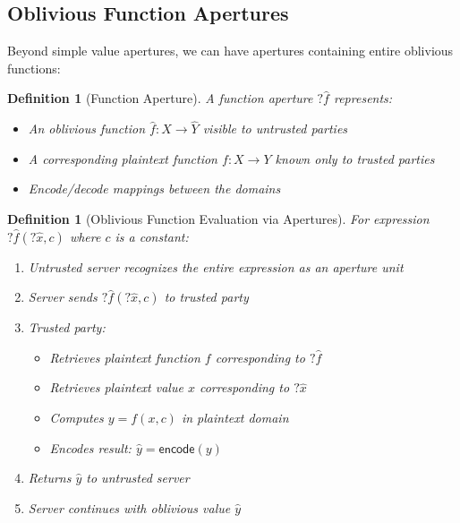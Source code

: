 \documentclass[12pt]{article}
\newtheorem{definition}[theorem]{Definition}
\begin{document}
\subsection{Oblivious Function Apertures}

Beyond simple value apertures, we can have apertures containing entire oblivious functions:

\begin{definition}[Function Aperture]
A function aperture $?\hat{f}$ represents:
\begin{itemize}
    \item An oblivious function $\hat{f}: \hat{X} \rightarrow \hat{Y}$ visible to untrusted parties
    \item A corresponding plaintext function $f: X \rightarrow Y$ known only to trusted parties
    \item Encode/decode mappings between the domains
\end{itemize}
\end{definition}

\begin{definition}[Oblivious Function Evaluation via Apertures]
For expression $?\hat{f}(?\hat{x}, c)$ where $c$ is a constant:
\begin{enumerate}
    \item Untrusted server recognizes the entire expression as an aperture unit
    \item Server sends $?\hat{f}(?\hat{x}, c)$ to trusted party
    \item Trusted party:
        \begin{itemize}
            \item Retrieves plaintext function $f$ corresponding to $?\hat{f}$
            \item Retrieves plaintext value $x$ corresponding to $?\hat{x}$
            \item Computes $y = f(x, c)$ in plaintext domain
            \item Encodes result: $\hat{y} = \mathsf{encode}(y)$
        \end{itemize}
    \item Returns $\hat{y}$ to untrusted server
    \item Server continues with oblivious value $\hat{y}$
\end{enumerate}
\end{definition}
\end{document}
